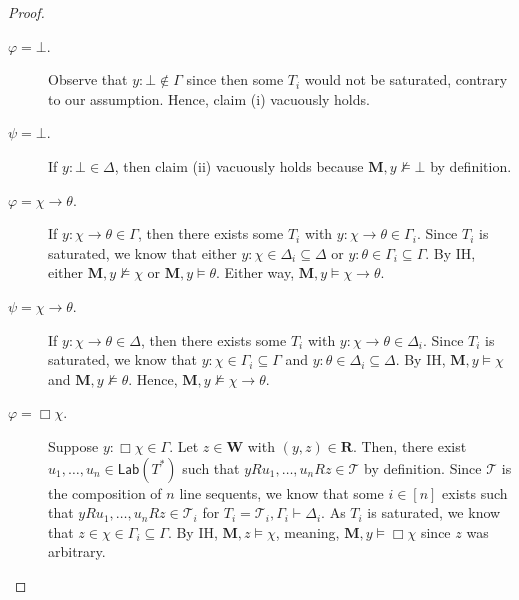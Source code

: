 \documentclass[copyright,creativecommons]{eptcs}
\newcommand{\tel}{\mathcal{T}}
\renewcommand{\phi}{\varphi}
\newcommand{\imp}{\rightarrow}
\newcommand{\lab}{\mathsf{Lab}}
\newcommand{\sar}{\vdash}
\newcommand{\tseq}{T} %
\newcommand{\M}{\mathbf{M}}
\newcommand{\W}{\mathbf{W}}
\newcommand{\R}{\mathbf{R}}
\begin{document}
\begin{proof}
\begin{description}
\item[$\phi = \bot.$] Observe that $y : \bot \not\in \Gamma$ since then some $\tseq_{i}$ would not be saturated, contrary to our assumption. Hence, claim (i) vacuously holds.

\item[$\psi = \bot.$] If $y : \bot \in \Delta$, then claim (ii) vacuously holds because $\M, y \not\models \bot$ by definition.

\item[$\phi = \chi \imp \theta.$] If $y : \chi \imp \theta \in \Gamma$, then there exists some $\tseq_{i}$ with $y : \chi \imp \theta \in \Gamma_{i}$. Since $\tseq_{i}$ is saturated, we know that either $y : \chi \in \Delta_{i} \subseteq \Delta$ or $y : \theta \in \Gamma_{i} \subseteq \Gamma$. By IH, either $\M,y \not\models \chi$ or $\M, y \models \theta$. Either way, $\M, y \models \chi \imp \theta$.

\item[$\psi = \chi \imp \theta.$] If $y : \chi \imp \theta \in \Delta$, then there exists some $\tseq_{i}$ with $y : \chi \imp \theta \in \Delta_{i}$. Since $\tseq_{i}$ is saturated, we know that $y : \chi \in \Gamma_{i} \subseteq \Gamma$ and $y : \theta \in \Delta_{i} \subseteq \Delta$. By IH, $\M,y \models \chi$ and $\M, y \not\models \theta$. Hence, $\M, y \not\models \chi \imp \theta$.

\item[$\phi = \Box \chi.$] Suppose $y : \Box \chi \in \Gamma$. Let $z \in \W$ with $(y,z) \in \R$. Then, there exist $u_{1}, \ldots, u_{n} \in \lab(\tseq^{*})$ such that $yRu_{1}, \ldots, u_{n}Rz \in \tel$ by definition. Since $\tel$ is the composition of $n$ line sequents, we know that some $i \in [n]$ exists such that $yRu_{1}, \ldots, u_{n}Rz \in \tel_{i}$ for $\tseq_{i} = \tel_{i}, \Gamma_{i} \sar \Delta_{i}$. As $\tseq_{i}$ is saturated, we know that $z \in \chi \in \Gamma_{i} \subseteq \Gamma$. By IH, $\M, z \models \chi$, meaning, $\M, y \models \Box \chi$ since $z$ was arbitrary.


\end{description}
\end{proof}
\end{document}
